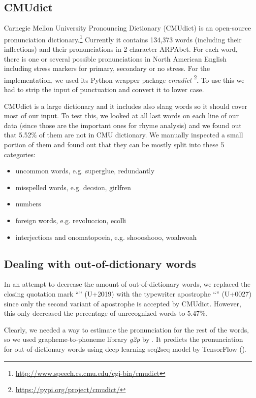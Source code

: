 \subsection{CMUdict}
Carnegie Mellon University Pronouncing Dictionary (CMUdict) is an open-source pronunciation dictionary.\footnote{\url{http://www.speech.cs.cmu.edu/cgi-bin/cmudict}} Currently it contains 134,373 words (including their inflections) and their pronunciations in 2-character ARPAbet. 
For each word, there is one or several possible pronunciations in North American English including stress markers for primary, secondary or no stress. For the implementation, we used its Python wrapper package \textit{cmudict} \footnote{\url{https://pypi.org/project/cmudict/}}. To use this we had to strip the input of punctuation and convert it to lower case.

CMUdict is a large dictionary and it includes also slang words so it should cover most of our input. To test this, we looked at all last words on each line of our data (since those are the important ones for rhyme analysis) and we found out that 5.52\% of them are not in CMU dictionary. We manually inspected a small portion of them and found out that they can be mostly split into these 5 categories:

\begin{itemize}
	\item uncommon words, e.g. superglue, redundantly
	\item misspelled words, e.g. decsion, girlfren
	\item numbers
	\item foreign words, e.g. revoluccion, ecolli
	\item interjections and onomatopoeia, e.g. shoooshooo, woahwoah
\end{itemize}

\subsection{Dealing with out-of-dictionary words}
In an attempt to decrease the amount of out-of-dictionary words, we replaced the closing quotation mark ``'' (U+2019) with the typewriter apostrophe ``\texttt{\selectfont{}}''
 (U+0027) since only the second variant of apostrophe is accepted by CMUdict. However, this only decreased the percentage of unrecognized words to 5.47\%.

Clearly, we needed a way to estimate the pronunciation for the rest of the words, so we used grapheme-to-phoneme library \textit{g2p} by \cite{g2pE2019}. It predicts the pronunciation for out-of-dictionary words using deep learning seq2seq model by TensorFlow (\cite{tensorflow2015-whitepaper}).

